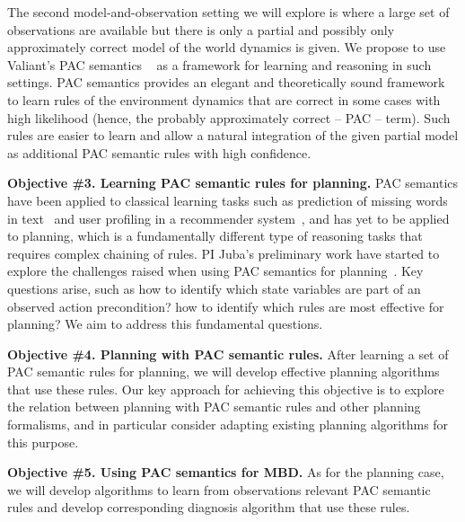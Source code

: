 \documentclass[12pt]{article}
\begin{document}
The second model-and-observation setting we will explore is where a large set of observations are available but there is only a partial and possibly only approximately correct model of the world dynamics is given. We propose to use Valiant's PAC semantics ~\cite{valiant2000robustLogics,valiant2000neuroidal} as a framework for learning and reasoning in such settings.  PAC semantics provides an elegant and theoretically sound framework to learn 
rules of the environment dynamics that are correct in some cases with high likelihood (hence, the probably approximately correct -- PAC -- term). 
Such rules are easier to learn and allow a natural integration of the given partial model as additional PAC semantic rules with high confidence. %

{\bf Objective \#3. Learning PAC semantic rules for planning.}
PAC semantics have been applied to classical learning tasks such as prediction of missing words in text~\cite{michael2008first} and user profiling in a recommender system~\cite{semeraro2009knowledge}, and has yet to be applied to planning, which is a fundamentally different type of reasoning tasks that requires complex chaining of rules. PI Juba's preliminary work have started to explore the challenges raised when using PAC semantics for planning~\cite{juba2016jmlr}. Key questions arise, such as how to identify which state variables are part of an observed action precondition? how to identify which rules are most effective for planning? We aim to address this fundamental questions.


{\bf Objective \#4. Planning with PAC semantic rules.}
After learning a set of PAC semantic rules for planning, we will develop effective planning algorithms that use these rules. Our key approach for achieving this objective is to explore the relation between planning with PAC semantic rules and other planning formalisms, and in particular consider adapting existing planning algorithms for this purpose.  


{\bf Objective \#5. Using PAC semantics for MBD.} 
As for the planning case, we will develop algorithms to learn 
from observations relevant PAC semantic rules and develop corresponding diagnosis algorithm that use these rules. 
\end{document}
